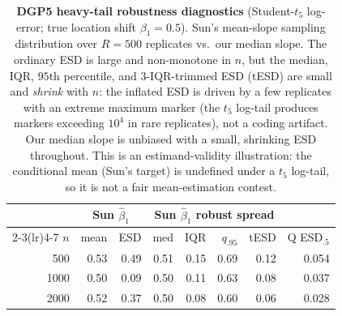 \begin{table}[t]\centering\small
\caption{\textbf{DGP5 heavy-tail robustness diagnostics} (Student-$t_5$ log-error; true location shift $\beta_1=0.5$). Sun's mean-slope sampling distribution over $R=500$ replicates vs.\ our median slope. The ordinary ESD is large and non-monotone in $n$, but the median, IQR, $95$th percentile, and $3$-IQR-trimmed ESD (tESD) are small and \emph{shrink} with $n$: the inflated ESD is driven by a few replicates with an extreme maximum marker (the $t_5$ log-tail produces markers exceeding $10^4$ in rare replicates), not a coding artifact. Our median slope is unbiased with a small, shrinking ESD throughout. This is an estimand-validity illustration: the conditional mean (Sun's target) is undefined under a $t_5$ log-tail, so it is not a fair mean-estimation contest.}
\label{tab:cmp-heavy}\begin{tabular}{r rr rrrr r}\toprule
&\multicolumn{2}{c}{Sun $\widehat\beta_1$}&\multicolumn{4}{c}{Sun $\widehat\beta_1$ robust spread}&\\
\cmidrule(lr){2-3}\cmidrule(lr){4-7}
$n$&mean&ESD&med&IQR&$q_{.95}$&tESD&Q ESD$_{.5}$\\\midrule
500 & 0.53 & 0.49 & 0.51 & 0.15 & 0.69 & 0.12 & 0.054\\
1000 & 0.50 & 0.09 & 0.50 & 0.11 & 0.63 & 0.08 & 0.037\\
2000 & 0.52 & 0.37 & 0.50 & 0.08 & 0.60 & 0.06 & 0.028\\
\bottomrule\end{tabular}\end{table}
